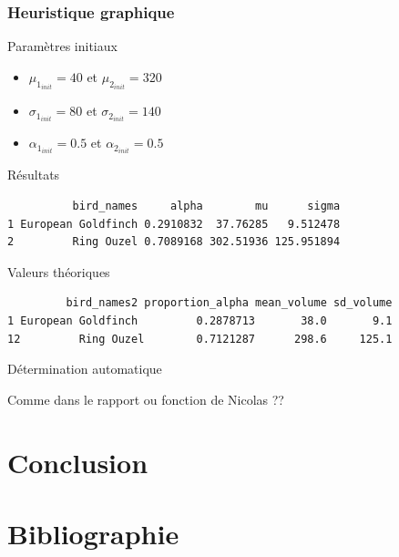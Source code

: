 \documentclass[11pt]{beamer}
\begin{document}
	\begin{frame}[fragile]\frametitle{Heuristique graphique}
		\begin{block}{\scriptsize Paramètres initiaux}
			\begin{itemize}
				\scriptsize
				\centering
				\item $\mu_{1_{init}} =  40$ et $\mu_{2_{init}} = 320$
				\item $\sigma_{1_{init}} =  80$ et $\sigma_{2_{init}} = 140$
				\item $\alpha_{1_{init}} = 0.5$ et $\alpha_{2_{init}} = 0.5$
			\end{itemize}
		\end{block}
		\begin{block}{\scriptsize Résultats}
			\scriptsize
			\begin{verbatim}
          bird_names     alpha        mu      sigma
1 European Goldfinch 0.2910832  37.76285   9.512478
2         Ring Ouzel 0.7089168 302.51936 125.951894
			\end{verbatim}
		\end{block}
		\begin{block}{\scriptsize Valeurs théoriques}
			\scriptsize
			\begin{verbatim}
         bird_names2 proportion_alpha mean_volume sd_volume
1 European Goldfinch         0.2878713       38.0       9.1
12         Ring Ouzel        0.7121287      298.6     125.1
			\end{verbatim}
		\end{block}
	\end{frame}


	\begin{frame}{Détermination automatique}
		\begin{block}{}
			Comme dans le rapport ou fonction de Nicolas ??
		\end{block}
	\end{frame}


	\section{Conclusion}


	\section{Bibliographie}
\end{document}

